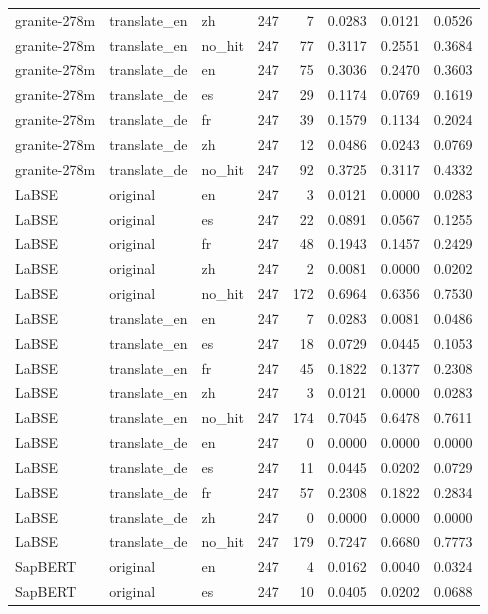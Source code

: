 \begin{tabular}{lllrrrrr}
granite-278m & translate\_en & zh & 247 & 7 & 0.0283 & 0.0121 & 0.0526 \\
granite-278m & translate\_en & no\_hit & 247 & 77 & 0.3117 & 0.2551 & 0.3684 \\
granite-278m & translate\_de & en & 247 & 75 & 0.3036 & 0.2470 & 0.3603 \\
granite-278m & translate\_de & es & 247 & 29 & 0.1174 & 0.0769 & 0.1619 \\
granite-278m & translate\_de & fr & 247 & 39 & 0.1579 & 0.1134 & 0.2024 \\
granite-278m & translate\_de & zh & 247 & 12 & 0.0486 & 0.0243 & 0.0769 \\
granite-278m & translate\_de & no\_hit & 247 & 92 & 0.3725 & 0.3117 & 0.4332 \\
LaBSE & original & en & 247 & 3 & 0.0121 & 0.0000 & 0.0283 \\
LaBSE & original & es & 247 & 22 & 0.0891 & 0.0567 & 0.1255 \\
LaBSE & original & fr & 247 & 48 & 0.1943 & 0.1457 & 0.2429 \\
LaBSE & original & zh & 247 & 2 & 0.0081 & 0.0000 & 0.0202 \\
LaBSE & original & no\_hit & 247 & 172 & 0.6964 & 0.6356 & 0.7530 \\
LaBSE & translate\_en & en & 247 & 7 & 0.0283 & 0.0081 & 0.0486 \\
LaBSE & translate\_en & es & 247 & 18 & 0.0729 & 0.0445 & 0.1053 \\
LaBSE & translate\_en & fr & 247 & 45 & 0.1822 & 0.1377 & 0.2308 \\
LaBSE & translate\_en & zh & 247 & 3 & 0.0121 & 0.0000 & 0.0283 \\
LaBSE & translate\_en & no\_hit & 247 & 174 & 0.7045 & 0.6478 & 0.7611 \\
LaBSE & translate\_de & en & 247 & 0 & 0.0000 & 0.0000 & 0.0000 \\
LaBSE & translate\_de & es & 247 & 11 & 0.0445 & 0.0202 & 0.0729 \\
LaBSE & translate\_de & fr & 247 & 57 & 0.2308 & 0.1822 & 0.2834 \\
LaBSE & translate\_de & zh & 247 & 0 & 0.0000 & 0.0000 & 0.0000 \\
LaBSE & translate\_de & no\_hit & 247 & 179 & 0.7247 & 0.6680 & 0.7773 \\
SapBERT & original & en & 247 & 4 & 0.0162 & 0.0040 & 0.0324 \\
SapBERT & original & es & 247 & 10 & 0.0405 & 0.0202 & 0.0688 \\

\end{tabular}
